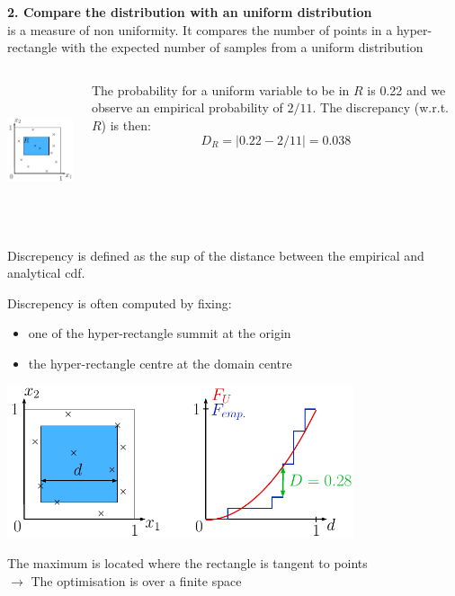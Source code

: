 \documentclass{beamer}
\begin{document}
\begin{frame}{}
\textbf{2. Compare the distribution with an uniform distribution}\\
 is a measure of non uniformity. It compares the number of points in a hyper-rectangle with the expected number of samples from a uniform distribution
\vspace{-2mm}
\begin{columns}[c]
\column{4cm}
\begin{center}
\includegraphics[height=4cm]{figures/latexdraw/discrepency}
\end{center}
\column{6cm}
The probability for a uniform variable to be in $R$ is 0.22 and we observe an empirical probability of $2/11$. The discrepancy (w.r.t. $R$) is then:
$$D_R = |0.22-2/11| = 0.038$$
\end{columns}
\vspace{2mm}
Discrepency is defined as the sup of the distance between the empirical and analytical cdf.
\end{frame}

\begin{frame}{}
Discrepency is often computed by fixing:
\begin{itemize}
 	\item one of the hyper-rectangle summit at the origin
 	\item the hyper-rectangle centre at the domain centre
 \end{itemize} 
\begin{center}
\includegraphics[height=4.5cm]{figures/latexdraw/discrepency3}
\end{center}
The maximum is located where the rectangle is tangent to points\\
$\rightarrow$ The optimisation is over a finite space
\end{frame}
\end{document}
